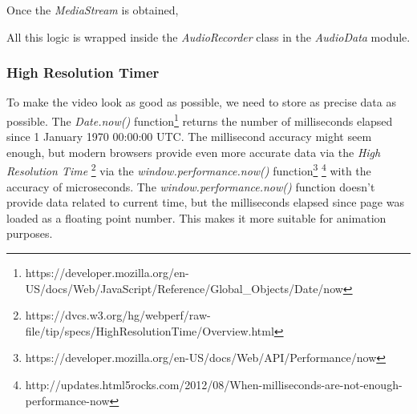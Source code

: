 Once the \textit{MediaStream} is obtained, 





All this logic is wrapped inside the \textit{AudioRecorder} class in the \textit{AudioData} module.


\subsubsection{High Resolution Timer}
To make the video look as good as possible, we need to store as precise data as possible. The \textit{Date.now()} function\footnote{https://developer.mozilla.org/en-US/docs/Web/JavaScript/Reference/Global\_Objects/Date/now} returns the number of milliseconds elapsed since 1 January 1970 00:00:00 UTC. The millisecond accuracy might seem enough, but modern browsers provide even more accurate data via the \textit{High Resolution Time} \footnote{https://dvcs.w3.org/hg/webperf/raw-file/tip/specs/HighResolutionTime/Overview.html} via the \textit{window.performance.now()} function\footnote{https://developer.mozilla.org/en-US/docs/Web/API/Performance/now} \footnote{http://updates.html5rocks.com/2012/08/When-milliseconds-are-not-enough-performance-now} with the accuracy of microseconds. The \textit{window.performance.now()} function doesn't provide data related to current time, but the milliseconds elapsed since page was loaded as a floating point number. This makes it more suitable for animation purposes.


